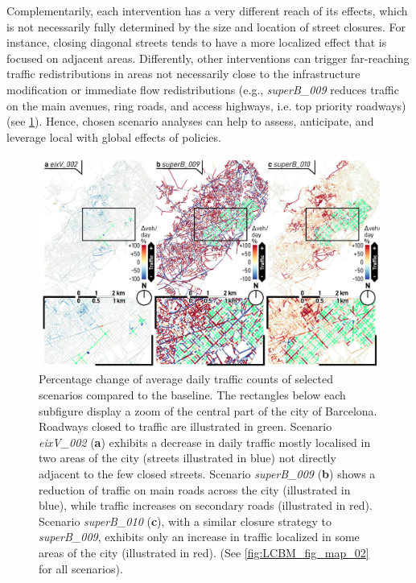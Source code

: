 Complementarily, each intervention has a very different reach of its effects, which is not necessarily fully determined by the size and location of street closures. For instance, closing diagonal streets tends to have a more localized effect that is focused on adjacent areas. Differently, other interventions can trigger far-reaching traffic redistributions in areas not necessarily close to the infrastructure modification or immediate flow redistributions (e.g., \emph{superB\_009} reduces traffic on the main avenues, ring roads, and access highways, i.e. top priority roadways) (see \cref{fig:LCBM_fig09}). Hence, chosen scenario analyses can help to assess, anticipate, and leverage local with global effects of policies.

\begin{figure}[htbp!]
    \centering
    \includegraphics[width=1\textwidth]{LCBM_fig09.jpg}
    \caption{Percentage change of average daily traffic counts of selected scenarios compared to the baseline. The rectangles below each subfigure display a zoom of the central part of the city of Barcelona. Roadways closed to traffic are illustrated in green. Scenario \emph{eixV\_002} (\textbf{a}) exhibits a decrease in daily traffic mostly localised in two areas of the city (streets illustrated in blue) not directly adjacent to the few closed streets. Scenario \emph{superB\_009} (\textbf{b}) shows a reduction of traffic on main roads across the city (illustrated in blue), while traffic increases on secondary roads (illustrated in red). Scenario \emph{superB\_010} (\textbf{c}), with a similar closure strategy to \emph{superB\_009}, exhibits only an increase in traffic localized in some areas of the city (illustrated in red). (See \cref{fig:LCBM_fig_map_02} for all scenarios). }
   \label{fig:LCBM_fig09}
\end{figure}

